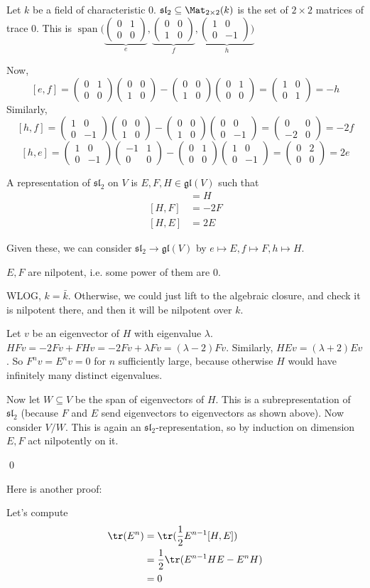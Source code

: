 \documentclass[x11names,reqno,14pt]{extarticle}
\newcommand{\pmat}[4]{\begin{pmatrix} #1 & #2 \\ #3 & #4 \end{pmatrix}}
\newcommand{\mk}[1]{\mathfrak{#1}}
\newcommand{\bark}{\bar{k}}
\newcommand{\gl}{\mk{g}\mk{l}}
\renewcommand{\sl}{\mk{s}\mk{l}}
\DeclareMathOperator{\Span}{span}
\begin{document}
Let $k$ be a field of characteristic 0. $\sl_2\subseteq\Mat_{2\times2}(k)$ is the set of $2\times2$ matrices of trace 0. This is $\Span(\underbrace{\pmat{0}{1}{0}{0}}_{e},\underbrace{\pmat{0}{0}{1}{0}}_{f},\underbrace{\pmat{1}{0}{0}{-1})}_{h}$

Now, 
\[
[e,f] = \pmat{0}{1}{0}{0}\pmat{0}{0}{1}{0} - \pmat{0}{0}{1}{0}\pmat{0}{1}{0}{0} = \pmat{1}{0}{0}{1} = -h
\]
Similarly, 
\[
[h,f] = \pmat{1}{0}{0}{-1}\pmat{0}{0}{1}{0}-\pmat{0}{0}{1}{0}\pmat{0}{0}{0}{-1} = \pmat{0}{0}{-2}{0} = -2f
\]
\[
[h,e] = \pmat{1}{0}{0}{-1}\pmat{-1}{1}{0}{0}-\pmat{0}{1}{0}{0}\pmat{1}{0}{0}{-1} = \pmat{0}{2}{0}{0} = 2e
\]

A representation of $\sl_2$ on $V$ is $E, F, H \in \gl(V)$ such that
\begin{align*}
[E,F] & = H \\
[H,F] & = -2F \\
[H,E] & = 2E
\end{align*}

Given these, we can consider $\sl_2\to\gl(V)$ by $e \mapsto E, f \mapsto F, h \mapsto H$.

\lem

$E, F$ are nilpotent, i.e. some power of them are 0. 

\proof

WLOG, $k = \bark$. Otherwise, we could just lift to the algebraic closure, and check it is nilpotent there, and then it will be nilpotent over $k$. 

Let $v$ be an eigenvector of $H$ with eigenvalue $\lambda$. 
$HFv = - 2Fv + FHv = -2Fv + \lambda Fv = (\lambda-2)Fv$. Similarly, $HEv = (\lambda+2)Ev$. So $F^nv = E^nv = 0$ for $n$ sufficiently large, because otherwise $H$ would have infinitely many distinct eigenvalues. 

Now let $W \subseteq V$ be the span of eigenvectors of $H$. This is a subrepresentation of $\sl_2$ (because $F$ and $E$ send eigenvectors to eigenvectors as shown above). Now consider $V/W$. This is again an $\sl_2$-representation, so by induction on dimension $E, F$ act nilpotently on it. 

\qed

Here is another proof:

\proof

Let's compute 
\begin{align*}
\tr(E^n) & = \tr(\frac{1}{2}E^{n-1}[H,E])\\
& = \frac12\tr(E^{n-1}HE - E^nH)\\
& = 0
\end{align*}
\end{document}

